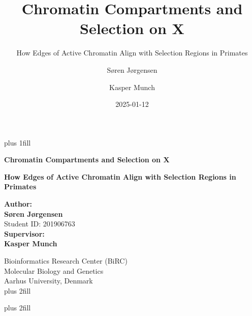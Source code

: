 \documentclass[
  11pt,
  a4paper,
]{scrbook}
\title{Chromatin Compartments and Selection on X}
\subtitle{How Edges of Active Chromatin Align with Selection Regions in
Primates}
\author{Søren Jørgensen \and Kasper Munch}
\date{2025-01-12}
\begin{document}
\frontmatter
\cleardoublepage
\thispagestyle{empty}
{\centering
\hbox{}\vskip 0cm plus 1fill

{%
\Huge\bfseries Chromatin Compartments and Selection on X \par}
\vspace{3ex}
{\Large\bfseries How Edges of Active Chromatin Align with Selection
Regions in Primates \par}
\vspace{5ex}

        {\bfseries Author: \\ \vspace{0.5ex}}
        {\bfseries\Large Søren Jørgensen \\ \vspace{0.7ex}}
            {\large Student ID: 201906763 \\ \vspace{1.2ex} }
        {\bfseries Supervisor: \\ \vspace{0.5ex}}
        {\bfseries\Large Kasper Munch \\ \vspace{0.7ex}}
        \par \vspace{0.7ex}
        {\large Bioinformatics Research Center (BiRC) \\ \vspace{0.7ex}}
        {\large Molecular Biology and Genetics \\ \vspace{0.7ex}}
        {\large Aarhus University, Denmark \\ \vspace{2ex}}
%
\vskip 0cm plus 2fill

{ \par}
\vskip 0cm plus 2fill

}
\end{document}

